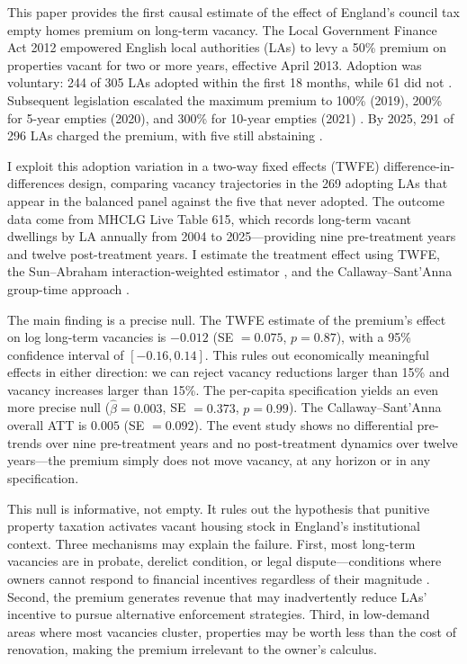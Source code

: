 \documentclass[12pt]{article}
\begin{document}
This paper provides the first causal estimate of the effect of England's council tax empty homes premium on long-term vacancy. The Local Government Finance Act 2012 empowered English local authorities (LAs) to levy a 50\% premium on properties vacant for two or more years, effective April 2013. Adoption was voluntary: 244 of 305 LAs adopted within the first 18 months, while 61 did not \citep{mhclg2014ctb}. Subsequent legislation escalated the maximum premium to 100\% (2019), 200\% for 5-year empties (2020), and 300\% for 10-year empties (2021) \citep{mhclg2023act}. By 2025, 291 of 296 LAs charged the premium, with five still abstaining \citep{mhclg2025ctb}.

I exploit this adoption variation in a two-way fixed effects (TWFE) difference-in-differences design, comparing vacancy trajectories in the 269 adopting LAs that appear in the balanced panel against the five that never adopted. The outcome data come from MHCLG Live Table 615, which records long-term vacant dwellings by LA annually from 2004 to 2025---providing nine pre-treatment years and twelve post-treatment years. I estimate the treatment effect using TWFE, the Sun--Abraham interaction-weighted estimator \citep{sun2021estimating}, and the Callaway--Sant'Anna group-time approach \citep{callaway2021difference}.

The main finding is a precise null. The TWFE estimate of the premium's effect on log long-term vacancies is $-0.012$ (SE $= 0.075$, $p = 0.87$), with a 95\% confidence interval of $[-0.16, 0.14]$. This rules out economically meaningful effects in either direction: we can reject vacancy reductions larger than 15\% and vacancy increases larger than 15\%. The per-capita specification yields an even more precise null ($\hat{\beta} = 0.003$, SE $= 0.373$, $p = 0.99$). The Callaway--Sant'Anna overall ATT is $0.005$ (SE $= 0.092$). The event study shows no differential pre-trends over nine pre-treatment years and no post-treatment dynamics over twelve years---the premium simply does not move vacancy, at any horizon or in any specification.

This null is informative, not empty. It rules out the hypothesis that punitive property taxation activates vacant housing stock in England's institutional context. Three mechanisms may explain the failure. First, most long-term vacancies are in probate, derelict condition, or legal dispute---conditions where owners cannot respond to financial incentives regardless of their magnitude \citep{lga2023empty}. Second, the premium generates revenue that may inadvertently reduce LAs' incentive to pursue alternative enforcement strategies. Third, in low-demand areas where most vacancies cluster, properties may be worth less than the cost of renovation, making the premium irrelevant to the owner's calculus.
\end{document}

